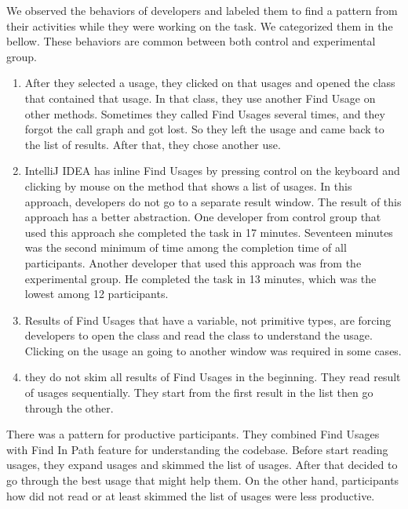 \documentclass[conference]{IEEEtran}
\begin{document}
We observed the behaviors of developers and labeled them to find a pattern from their activities while they were working on the task. We categorized them in the bellow. These behaviors are common between both control and experimental group. 
\begin{enumerate}

\item After they selected a usage, they clicked on that usages and opened the class that contained that usage. In that class, they use another Find Usage on other methods. Sometimes they called Find Usages several times, and they forgot the call graph and got lost. So they left the usage and came back to the list of results. After that, they chose another use. 
\item IntelliJ IDEA has inline Find Usages by pressing control on the keyboard and clicking by mouse on the method that shows a list of usages. In this approach, developers do not go to a separate result window. The result of this approach has a better abstraction. One developer from control group that used this approach she completed the task in 17 minutes. Seventeen minutes was the second minimum of time among the completion time of all participants. Another developer that used this approach was from the experimental group. He completed the task in 13 minutes, which was the lowest among 12 participants. 
\item Results of Find Usages that have a variable, not primitive types, are forcing developers to open the class and read the class to understand the usage. Clicking on the usage an going to another window was required in some cases.
\item they do not skim all results of Find Usages in the beginning. They read result of usages sequentially. They start from the first result in the list then go through the other. 
\end{enumerate}\par


There was a pattern for productive participants. They combined Find Usages with Find In Path feature for understanding the codebase. Before start reading usages, they expand usages and skimmed the list of usages. After that decided to go through the best usage that might help them. On the other hand, participants how did not read or at least skimmed the list of usages were less productive. \par
\end{document}
